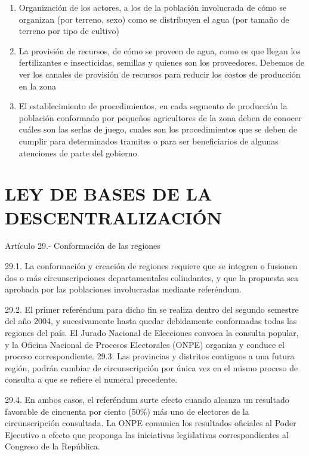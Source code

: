 \documentclass[
  a4paper,
]{article}
\providecommand{\tightlist}{%
  \setlength{\itemsep}{0pt}\setlength{\parskip}{0pt}}\usepackage{longtable,booktabs,array}
\begin{document}
\begin{enumerate}
\def\labelenumi{\arabic{enumi}.}
\tightlist
\item
  Organización de los actores, a los de la población involucrada de cómo
  se organizan (por terreno, sexo) como se distribuyen el agua (por
  tamaño de terreno por tipo de cultivo)
\item
  La provisión de recursos, de cómo se proveen de agua, como es que
  llegan los fertilizantes e insecticidas, semillas y quienes son los
  proveedores. Debemos de ver los canales de provisión de recursos para
  reducir los costos de producción en la zona
\item
  El establecimiento de procedimientos, en cada segmento de producción
  la población conformado por pequeños agricultores de la zona deben de
  conocer cuáles son las serlas de juego, cuales son los procedimientos
  que se deben de cumplir para determinados tramites o para ser
  beneficiarios de algunas atenciones de parte del gobierno.
\end{enumerate}

\hypertarget{ley-de-bases-de-la-descentralizaciuxf3n}{%
\section{LEY DE BASES DE LA
DESCENTRALIZACIÓN}\label{ley-de-bases-de-la-descentralizaciuxf3n}}

Artículo 29.- Conformación de las regiones

29.1. La conformación y creación de regiones requiere que se integren o
fusionen dos o más circunscripciones departamentales colindantes, y que
la propuesta sea aprobada por las poblaciones involucradas mediante
referéndum.

29.2. El primer referéndum para dicho fin se realiza dentro del segundo
semestre del año 2004, y sucesivamente hasta quedar debidamente
conformadas todas las regiones del país. El Jurado Nacional de
Elecciones convoca la consulta popular, y la Oficina Nacional de
Procesos Electorales (ONPE) organiza y conduce el proceso
correspondiente. 29.3. Las provincias y distritos contiguos a una futura
región, podrán cambiar de circunscripción por única vez en el mismo
proceso de consulta a que se refiere el numeral precedente.

29.4. En ambos casos, el referéndum surte efecto cuando alcanza un
resultado favorable de cincuenta por ciento (50\%) más uno de electores
de la circunscripción consultada. La ONPE comunica los resultados
oficiales al Poder Ejecutivo a efecto que proponga las iniciativas
legislativas correspondientes al Congreso de la República.
\end{document}
